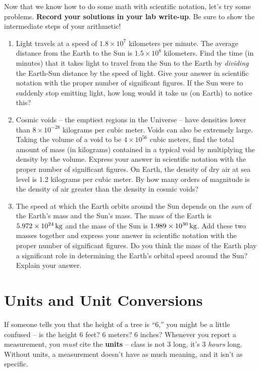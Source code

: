 \documentclass[11pt]{article}
\begin{document}
Now that we know how to do some math with scientific notation, let's try some problems. \textbf{Record your solutions in your lab write-up}. Be sure to show the intermediate steps of your arithmetic!  
\begin{enumerate}
    \item Light travels at a speed of $1.8 \times 10^7$ kilometers per minute. The average distance from the Earth to the Sun is $1.5 \times 10^8$ kilometers. Find the time (in minutes) that it takes light to travel from the Sun to the Earth by \emph{dividing} the Earth-Sun distance by the speed of light. Give your answer in scientific notation with the proper number of significant figures. If the Sun were to suddenly stop emitting light, how long would it take us (on Earth) to notice this? 
    
    \item Cosmic voids -- the emptiest regions in the Universe -- have densities lower than $8 \times 10^{-28}$ kilograms per cubic meter. Voids can also be extremely large. Taking the volume of a void to be $4 \times 10^{56}$ cubic meters, find the total amount of mass (in kilograms) contained in a typical void by multiplying the density by the volume. Express your answer in scientific notation with the proper number of significant figures. On Earth, the density of dry air at sea level is 1.2 kilograms per cubic meter. By how many orders of magnitude is the density of air greater than the density in cosmic voids?
    
    \item The speed at which the Earth orbits around the Sun depends on the \emph{sum} of the Earth's mass and the Sun's mass. The mass of the Earth is $5.972 \times 10^{24} \, {\rm kg}$ and the mass of the Sun is $1.989 \times 10^{30} \, {\rm kg}$. Add these two masses together and express your answer in scientific notation with the proper number of significant figures. Do you think the mass of the Earth play a significant role in determining the Earth's orbital speed around the Sun? Explain your answer.
\end{enumerate}

\bigskip

\section{Units and Unit Conversions}
If someone tells you that the height of a tree is ``6,'' you might be a little confused -- is the height 6 feet? 6 meters? 6 inches? Whenever you report a measurement, you \emph{must} cite the \textbf{units} -- class is not 3 long, it's 3 \emph{hours} long. Without units, a measurement doesn't have as much meaning, and it isn't as specific. 
\end{document}
